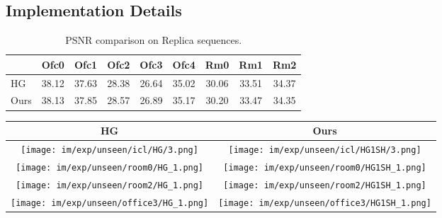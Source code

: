 

\subsection{Implementation Details}
\begin{table} [b]%
\vspace{-.5cm}
  \caption {PSNR comparison on Replica sequences.} 
	\begin{adjustwidth}{0pt}{0pt}  
		\centering
		{\scriptsize
			\begin{tabular}{l|cccccccc}
				\hline
				& Ofc0
				& Ofc1
				& Ofc2
				& Ofc3
				& Ofc4
				& Rm0
				& Rm1
				& Rm2\\ \hline
				HG & 38.12&37.63&28.38&26.64&35.02&30.06	&33.51&34.37 \\
				\hline
				Ours 
				& 38.13
				& 37.85
				& 28.57
				& 26.89
				& 35.17
				& 30.20
				& 33.47
				& 34.35\\
				\hline
			\end{tabular} 
		}
		\label{tab:comp_rep1}
	\end{adjustwidth}
	
\end{table}
\begin{table}[b!]
	\vspace{-.5cm}
	\centering
	\setlength{\tabcolsep}{0.1em}
	\renewcommand{\arraystretch}{.01}
	\begin{tabular}{c |c}
		\hline
		{\large HG} &{\large \textbf{Ours}} \\\hline
		\texttt{[image: im/exp/unseen/icl/HG/3.png]}
		&\texttt{[image: im/exp/unseen/icl/HG1SH/3.png]}\\\hline\hline
		
		\texttt{[image: im/exp/unseen/room0/HG\_1.png]}
		&\texttt{[image: im/exp/unseen/room0/HG1SH\_1.png]}\\	\hline
		
		\texttt{[image: im/exp/unseen/room2/HG\_1.png]}
		&\texttt{[image: im/exp/unseen/room2/HG1SH\_1.png]}\\	\hline\hline		
		
		\texttt{[image: im/exp/unseen/office3/HG\_1.png]}
		&\texttt{[image: im/exp/unseen/office3/HG1SH\_1.png]}\\
		\hline
	\end{tabular}
	\label{fig:exp:icl_unseen}
\end{table}

